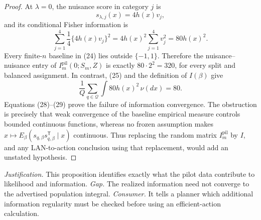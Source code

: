 \documentclass{article}
\begin{document}
\begin{proof}
At \(\lambda=0\), the nuisance score in category \(j\) is
\[
s_{\lambda,j}(x)=4h(x)v_j,
\]
and its conditional Fisher information is
\[
\sum_{j=1}^4\frac14\{4h(x)v_j\}^2
=4h(x)^2\sum_{j=1}^4v_j^2
=80h(x)^2.
\tag{28}
\]
Every finite-\(n\) baseline in (24) lies outside \(\{-1,1\}\).  Therefore the nuisance--nuisance entry of \(I_m^{\mathrm{pil}}(0;S_m,Z)\) is exactly \(80\cdot2^2=320\), for every split and balanced assignment.  In contrast, (25) and the definition of \(I(\beta)\) give
\[
\frac1Q\sum_{q\in\mathcal Q}
\int80h(x)^2\,\nu(dx)=80.
\tag{29}
\]
Equations (28)--(29) prove the failure of information convergence.  The obstruction is precisely that weak convergence of the baseline empirical measure controls bounded continuous functions, whereas no frozen assumption makes
\(x\mapsto E_\beta(s_{q,\beta}s_{q,\beta}^{\mathsf T}\mid x)\)
continuous.  Thus replacing the random matrix \(I_m^{\mathrm{pil}}\) by \(I\), and any LAN-to-action conclusion using that replacement, would add an unstated hypothesis.
\end{proof}
\par\smallskip\noindent \textit{Justification.} This proposition identifies exactly what the pilot data contribute to likelihood and information. \textit{Gap.} The realized information need not converge to the advertised population integral. \textit{Consumer.} It tells a planner which additional information regularity must be checked before using an efficient-action calculation.
\end{document}
